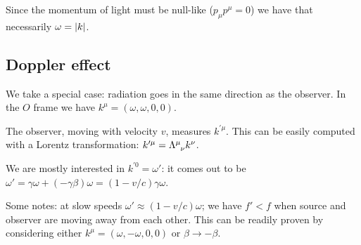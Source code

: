 \documentclass[main.tex]{subfiles}
\begin{document}
Since the momentum of light must be null-like (\(p_{\mu } p^{\mu } = 0\)) we have that necessarily \(\omega = \abs{k} \).

\subsection{Doppler effect}

We take a special case: radiation goes in the same direction as the observer.
In the \(O\) frame we have \(k^{\mu} = (\omega, \omega,0,0)\).

The observer, moving with velocity \(v\), measures \(k^{\prime \mu}\). This can be easily computed with a Lorentz transformation: \(k^{\prime \mu} = \tensor{\Lambda}{^\mu_\nu} k^\nu\).

We are mostly interested in \(k^{\prime 0} = \omega'\): it comes out to be \(\omega' = \gamma \omega + (- \gamma \beta)\omega = (1- v/c) \gamma \omega\).

Some notes: at slow speeds \(\omega' \approx (1-v/c) \omega\); we have \(f'<f\) when source and observer are moving away from each other. This can be readily proven by considering either \(k^{\mu } = (\omega , -\omega , 0,0)\) or \(\beta \rightarrow - \beta \). 
\end{document}
